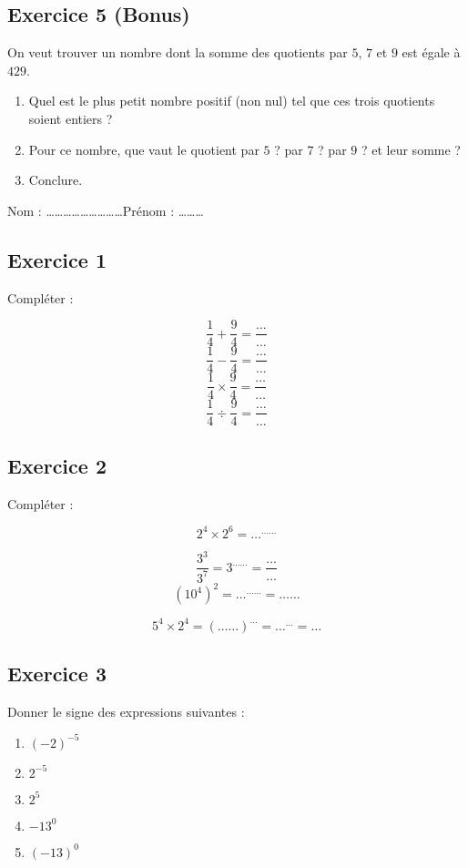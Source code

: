 \documentclass[14 pt]{extarticle}
\theoremstyle{plain}
\begin{document}
\subsection*{Exercice 5 (Bonus)}
On veut trouver un nombre dont la somme des quotients par $5$, $7$ et $9$ est égale à $429$. \begin{enumerate}
\item Quel est le plus petit nombre positif (non nul) tel que ces trois quotients soient entiers ? 
\item Pour ce nombre, que vaut le quotient par $5$ ? par $7$ ? par $9$ ? et leur somme ? 
\item Conclure. 
\end{enumerate}
\newpage

 
 Nom : \ldots\ldots\ldots\ldots\ldots\ldots\ldots\ldots\ldots Prénom : \ldots\ldots\ldots \\ 
 
 \subsection*{Exercice 1}
 
 Compléter : 
 
 \[ \frac14 + \frac94 = \frac\ldots\ldots   \]
 \[ \frac14 - \frac94 = \frac\ldots\ldots   \]
 \[ \frac14 \times \frac94 = \frac\ldots\ldots   \]
 \[ \frac14 \div \frac94 = \frac\ldots\ldots   \]
 
\subsection*{Exercice 2}

Compléter : 

\[ 2^4 \times 2^6 = \ldots^{\ldots\ldots}
\]

\[ \frac{3^3}{3^7} = 3^{\ldots\ldots} =\frac{\ldots}{\ldots}  \]
\[(10^4)^2 = \ldots^{\ldots\ldots} = \ldots\ldots\]

\[ 5^4 \times 2^4 = ({\ldots\ldots})^{\ldots} = {\ldots}^{\ldots} = \ldots\]

 
 \subsection*{Exercice 3}
 
 Donner le signe des expressions suivantes : \begin{enumerate}
 \item $(-2)^{-5}$ 
 \item $2^{-5}$
 \item $2^{5}$
 \item $ -13^0$
 \item $(-13)^0$
 \end{enumerate}
 
\end{document}
